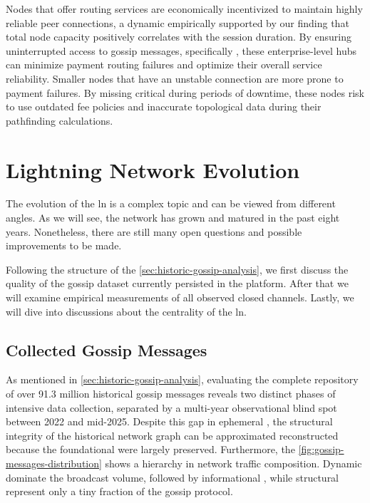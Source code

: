 Nodes that offer routing services are economically incentivized to maintain highly reliable peer connections,
a dynamic empirically supported by our finding that total node capacity positively correlates with the session duration. 
By ensuring uninterrupted access to gossip messages, specifically ,
these enterprise-level hubs can minimize payment routing failures and optimize their overall service reliability.
Smaller nodes that have an unstable connection are more prone to payment failures. 
By missing critical  during periods of downtime, 
these nodes risk to use outdated fee policies and inaccurate topological data during their pathfinding calculations.



\section{Lightning Network Evolution}
\label{sec:ln-evolution}

The evolution of the \gls{ln} is a complex topic and can be viewed from different angles.
As we will see, the network has grown and matured in the past eight years.
Nonetheless, there are still many open questions and possible improvements to be made.

Following the structure of the \autoref{sec:historic-gossip-analysis}, 
we first discuss the quality of the gossip dataset currently persisted in the  platform.
After that we will examine empirical measurements of all observed closed channels.
Lastly, we will dive into discussions about the centrality of the \gls{ln}.


\subsection{Collected Gossip Messages}

As mentioned in \autoref{sec:historic-gossip-analysis}, evaluating the complete 
repository of over \num{91.3} million historical gossip messages 
reveals two distinct phases of intensive data collection, 
separated by a multi-year observational blind spot between 2022 and mid-2025. 
Despite this gap in ephemeral , 
the structural integrity of the historical network graph can be approximated reconstructed 
because the foundational  were largely preserved. 
Furthermore, the \autoref{fig:gossip-messages-distribution} shows a hierarchy in network traffic composition. 
Dynamic  dominate the broadcast volume, followed by informational , 
while structural  represent only a tiny fraction of the gossip protocol.


